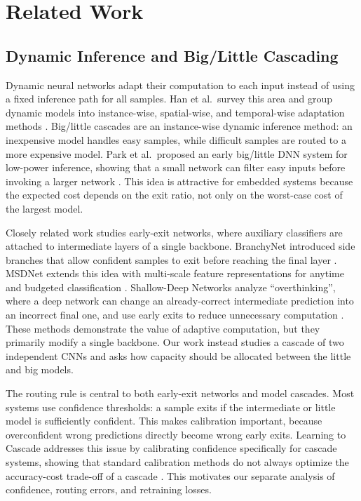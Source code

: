 \documentclass[conference]{IEEEtran}
\begin{document}
\section{Related Work}
\label{sec:related}

\subsection{Dynamic Inference and Big/Little Cascading}
\label{sec:related:dynamic}

Dynamic neural networks adapt their computation to each input instead of using a
fixed inference path for all samples. Han et al.\ survey this area and group
dynamic models into instance-wise, spatial-wise, and temporal-wise adaptation
methods \cite{han2021dynamic}. Big/little cascades are an instance-wise dynamic
inference method: an inexpensive model handles easy samples, while difficult
samples are routed to a more expensive model. Park et al.\ proposed an early
big/little DNN system for low-power inference, showing that a small network can
filter easy inputs before invoking a larger network \cite{park2015biglittle}.
This idea is attractive for embedded systems because the expected cost depends
on the exit ratio, not only on the worst-case cost of the largest model.

Closely related work studies early-exit networks, where auxiliary classifiers
are attached to intermediate layers of a single backbone. BranchyNet introduced
side branches that allow confident samples to exit before reaching the final
layer \cite{teerapittayanon2017branchynet}. MSDNet extends this idea with
multi-scale feature representations for anytime and budgeted classification
\cite{huang2018msdnet}. Shallow-Deep Networks analyze ``overthinking'', where a
deep network can change an already-correct intermediate prediction into an
incorrect final one, and use early exits to reduce unnecessary computation
\cite{kaya2019shallowdeep}. These methods demonstrate the value of adaptive
computation, but they primarily modify a single backbone. Our work instead
studies a cascade of two independent CNNs and asks how capacity should be
allocated between the little and big models.

The routing rule is central to both early-exit networks and model cascades.
Most systems use confidence thresholds: a sample exits if the intermediate or
little model is sufficiently confident. This makes calibration important,
because overconfident wrong predictions directly become wrong early exits.
Learning to Cascade addresses this issue by calibrating confidence specifically
for cascade systems, showing that standard calibration methods do not always
optimize the accuracy-cost trade-off of a cascade \cite{li2021learningtocascade}.
This motivates our separate analysis of confidence, routing errors, and
retraining losses.
\end{document}
